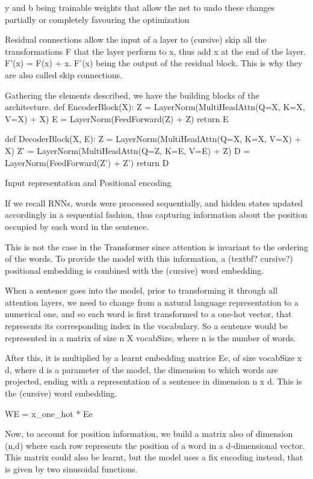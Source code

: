 \documentclass[11pt,english,listoffigures,listoftables]{tfgetsinf}
\begin{document}
y and b being trainable weights that allow the net to undo these changes partially or completely favouring the optimization

Residual connections allow the input of a layer to (cursive) skip all the transformations F that the layer perform to x, thus add x at the end of the layer.
F'(x) = F(x) + x. 
F'(x) being the output of the residual block.
This is why they are also called skip connections. 


Gathering the elements described, we have the building blocks of the architecture.
def EncoderBlock(X):
Z = LayerNorm(MultiHeadAttn(Q=X, K=X, V=X) + X)
E = LayerNorm(FeedForward(Z) + Z)
return E

def DecoderBlock(X, E):
Z = LayerNorm(MultiHeadAttn(Q=X, K=X, V=X) + X)
Z’ = LayerNorm(MultiHeadAttn(Q=Z, K=E, V=E) + Z)
D = LayerNorm(FeedForward(Z’) + Z’)
return D


Input representation and Positional encoding

If we recall RNNs, words were processed sequentially, and hidden states updated accordingly in a sequential fashion, thus capturing information about the position occupied by each word in the sentence. 

This is not the case in the Transformer since attention is invariant to the ordering of the words. To provide the model with this information, a (textbf? cursive?) positional embedding is combined with the (cursive) word embedding.

When a sentence goes into the model, prior to transforming it through all attention layers, we need to change from a natural language representation to a numerical one, and so each word is first transformed to a one-hot vector, that represents its corresponding index in the vocabulary. So a sentence would be represented in a matrix of size n X vocabSize, where n is the number of words.

After this, it is multiplied by a learnt embedding matrice Ee, of size vocabSize x d, where d is a parameter of the model, the dimension to which words are projected, ending with a representation of a sentence in dimension n x d. This is the (cursive) word embedding.

    WE = x_one_hot * Ee

Now, to account for position information, we build a matrix also of dimension (n,d) where each row represents the position of a word in a d-dimensional vector. This matrix could also be learnt, but the model uses a fix encoding instead, that is given by two sinusoidal functions.
\end{document}
